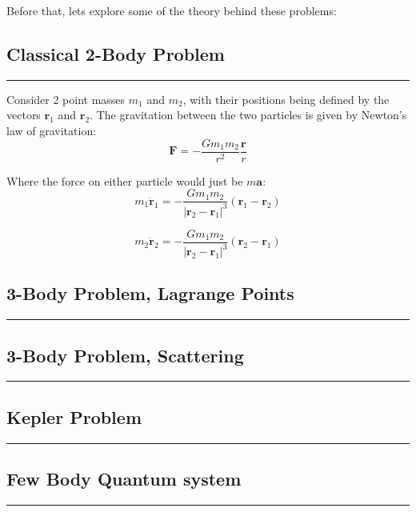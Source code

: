 \documentclass[hidelinks, 11pt, dvipsnames]{article}
\newcommand{\psubsection}[1]{{
    \begin{center}
            \section*{\Large #1}
        \noindent \rule{17cm}{0.2pt}
    \end{center}
}}
\begin{document}
Before that, lets explore some of the theory behind these problems:
\psubsection{Classical 2-Body Problem}

Consider 2 point masses $m_1$ and $m_2$, with their positions being defined by the vectors $\mathbf{r}_1$ and $\mathbf{r}_2$. The gravitation between the two particles is given by Newton's law of gravitation:
$$\mathbf{F}=-\frac{G m_{1} m_{2}}{r^{2}} \frac{\mathbf{r}}{r}\nonumber$$

Where the force on either particle would just be $m\mathbf{a}$:
$$m_{1} \ddot{\mathbf{r}}_{1}=-\frac{G m_{1} m_{2}}{\left|\mathbf{r}_{2}-\mathbf{r}_{1}\right|^{3}}\left(\mathbf{r}_{1}-\mathbf{r}_{2}\right) \nonumber$$

$$m_{2} \ddot{\mathbf{r}}_{2}=-\frac{G m_{1} m_{2}}{\left|\mathbf{r}_{2}-\mathbf{r}_{1}\right|^{3}}\left(\mathbf{r}_{2}-\mathbf{r}_{1}\right) \nonumber$$

\psubsection{3-Body Problem, Lagrange Points}

\psubsection{3-Body Problem, Scattering}

\psubsection{Kepler Problem}

\psubsection{Few Body Quantum system}
\end{document}
